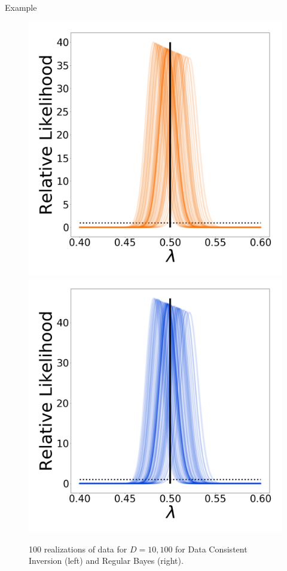 \begin{block}{Example}
\begin{figure}
        \includegraphics[width=13cm]{figures/updated_stability_D100_sigma-10E-4}
        \includegraphics[width=13cm]{figures/posterior_stability_D100_sigma-10E-4}
        \vspace{-1cm}
        \caption{100 realizations of data for $D=10,100$ for Data Consistent Inversion (left) and Regular Bayes (right).}
    \end{figure}

\end{block}
